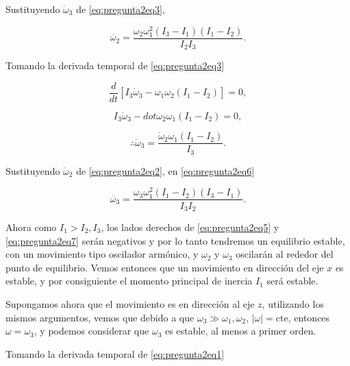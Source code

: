 \documentclass[a4paper,10pt]{article}
\numberwithin{equation}{section}
\begin{document}
Sustituyendo $\dot{\omega}_3$ de \eqref{eq:pregunta2eq3}, 

\begin{equation}
 \ddot{\omega_2} = \frac{\omega_2\omega_1^2(I_3 - I_1)(I_1 - I_2)}{I_2I_3}.
 \label{eq:pregunta2eq5}
\end{equation}

Tomando la derivada temporal de \eqref{eq:pregunta2eq3} 

\begin{equation}
 \frac{d}{dt}\left[I_3\dot{\omega}_3 - \omega_1\omega_2(I_1 - I_2) \right] = 0,
\end{equation}

\begin{equation}
 I_3\ddot{\omega}_3 - dot{\omega}_2\omega_1(I_1 - I_2) = 0,
\end{equation}

\begin{equation}
 \therefore \ddot{\omega}_3 = \frac{\dot{\omega}_2\omega_1(I_1-I_2)}{I_3}.
 \label{eq:pregunta2eq6}
\end{equation}

Sustituyendo $\dot{\omega}_2$ de \eqref{eq:pregunta2eq2}, en \eqref{eq:pregunta2eq6}

\begin{equation}
 \ddot{\omega_3} = \frac{\omega_3\omega_1^2(I_1 - I_2)(I_3 - I_1)}{I_3I_2}.
 \label{eq:pregunta2eq7}
\end{equation}

Ahora como $I_1 > I_2,I_3$, los lados derechos de \eqref{eq:pregunta2eq5} y 
\eqref{eq:pregunta2eq7} serán negativos y por lo tanto tendremos un equilibrio 
estable, con un movimiento tipo oscilador armónico, y $\omega_2$ y $\omega_3$ 
oscilarán al rededor del punto de equilibrio. Vemos entonces que un movimiento 
en dirección del eje $x$ es estable, y por consiguiente el momento principal 
de inercia $I_1$ será estable. 

\vspace{.3cm}

Supongamos ahora que el movimiento es en dirección al eje $z$, utilizando los 
mismos argumentos, vemos que debido a que $\omega_3 \gg \omega_1,\omega_2$, 
$|\omega| = \text{cte}$, entonces $\omega = \omega_3$, y podemos considerar 
que $\omega_3$ es estable, al menos a primer orden. 

\vspace{.3cm}

Tomando la derivada temporal de \eqref{eq:pregunta2eq1} 
\end{document}

